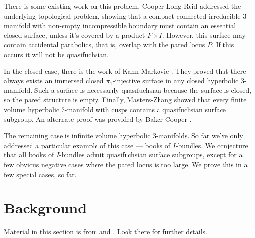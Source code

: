 \documentclass[12pt]{amsart}
\theoremstyle{definition}
\theoremstyle{remark}
\begin{document}
There is some existing work on this problem. Cooper-Long-Reid \cite{CLR}
addressed the underlying topological problem, showing that a compact connected
irreducible 3-manifold with non-empty incompressible boundary  must contain an
essential closed surface, unless it's covered by a product $F\times I$.
However, this surface may contain accidental parabolics, that is, overlap with
the pared locus $P$. If this occurs it will not be quasifuchsian.


In the closed case, there is the work of Kahn-Markovic \cite{KM}. They proved
that there always exists an immersed closed $\pi_1$-injective surface in any
closed hyperbolic 3-manifold.  Such a surface is necessarily quasifuchsian
because the surface is closed, so the pared structure is empty. Finally,
Masters-Zhang \cite{MZ} showed that every finite volume hyperbolic 3-manifold
with cusps contains a quasifuchsian surface subgroup. An alternate proof was
provided by Baker-Cooper \cite{BC}.

The remaining case is infinite volume hyperbolic 3-manifolds. So far we've only
addressed a particular example of this case --- books of $I$-bundles. We
conjecture that all books of $I$-bundles admit quasifuchsian surface subgroups,
except for a few obvious negative cases where the pared locus is too large. We
prove this in a few special cases, so far.

\section{Background}

Material in this section is from \cite{Mo} and \cite{CMc}. Look there for
further details.
\end{document}
